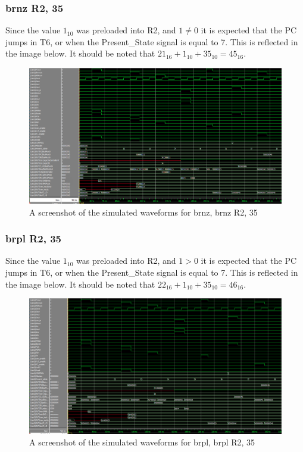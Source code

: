 \documentclass{article}
\begin{document}
        \subsubsection{brnz R2, 35}
            Since the value $1_{10}$ was preloaded into R2, and $1 \neq 0$ it is expected that the PC jumps in T6, or when the Present\_State signal is equal to 7. This is reflected in the image below. It should be noted that $21_{16} + 1_{10} + 35_{10} = 45_{16}$. 

                \begin{figure}[h!]
                    \begin{center}
                        \includegraphics[width=15cm]{brnz_wave.png}
                        \caption{A screenshot of the simulated waveforms for brnz, brnz R2, 35}
                    \end{center}
                \end{figure}

        \subsubsection{brpl R2, 35}
            Since the value $1_{10}$ was preloaded into R2, and $1 > 0$ it is expected that the PC jumps in T6, or when the Present\_State signal is equal to 7. This is reflected in the image below. It should be noted that $22_{16} + 1_{10} + 35_{10} = 46_{16}$. 
        
                \begin{figure}[h!]
                    \begin{center}
                        \includegraphics[width=15cm]{brpl_wave.png}
                        \caption{A screenshot of the simulated waveforms for brpl, brpl R2, 35}
                    \end{center}
                \end{figure}
\end{document}
